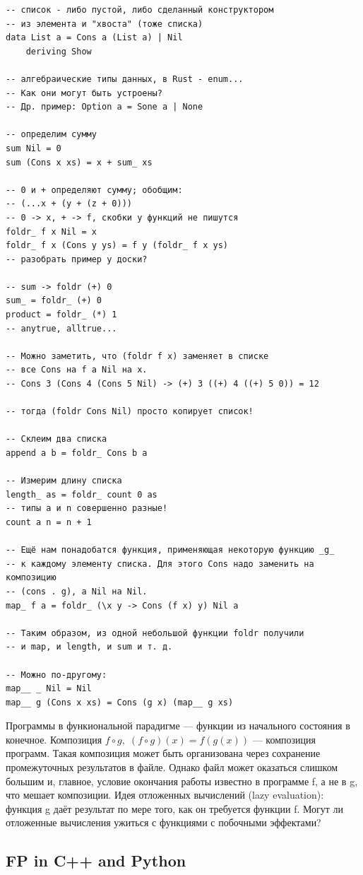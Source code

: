\documentclass{book}
\begin{document}
\begin{verbatim}
-- список - либо пустой, либо сделанный конструктором
-- из элемента и "хвоста" (тоже списка)
data List a = Cons a (List a) | Nil
    deriving Show

-- алгебраические типы данных, в Rust - enum...
-- Как они могут быть устроены?
-- Др. пример: Option a = Sone a | None

-- определим сумму
sum Nil = 0
sum (Cons x xs) = x + sum_ xs

-- 0 и + определяют сумму; обобщим:
-- (...x + (y + (z + 0)))
-- 0 -> x, + -> f, скобки у функций не пишутся
foldr_ f x Nil = x
foldr_ f x (Cons y ys) = f y (foldr_ f x ys)
-- разобрать пример у доски?

-- sum -> foldr (+) 0
sum_ = foldr_ (+) 0
product = foldr_ (*) 1
-- anytrue, alltrue...

-- Можно заметить, что (foldr f x) заменяет в списке
-- все Cons на f а Nil на x.
-- Cons 3 (Cons 4 (Cons 5 Nil) -> (+) 3 ((+) 4 ((+) 5 0)) = 12

-- тогда (foldr Cons Nil) просто копирует список!

-- Склеим два списка
append a b = foldr_ Cons b a

-- Измерим длину списка
length_ as = foldr_ count 0 as
-- типы a и n совершенно разные!
count a n = n + 1

-- Ещё нам понадобатся функция, применяющая некоторую функцию _g_
-- к каждому элементу списка. Для этого Cons надо заменить на композицию
-- (cons . g), а Nil на Nil.
map_ f a = foldr_ (\x y -> Cons (f x) y) Nil a

-- Таким образом, из одной небольшой функции foldr получили
-- и map, и length, и sum и т. д.

-- Можно по-другому:
map__ _ Nil = Nil
map__ g (Cons x xs) = Cons (g x) (map__ g xs)
\end{verbatim}

Программы в функиональной парадигме --- функции из начального состояния в конечное. Композиция $f
\circ g, \; (f \circ g)(x) = f(g(x))$ --- композиция программ. Такая композиция может быть
организована через сохранение промежуточных результатов в файле. Однако файл может оказаться
слишком большим и, главное, условие окончания работы известно в программе f, а не в g, что мешает
композиции. Идея отложенных вычислений (lazy evaluation): функция g даёт результат по мере того,
как он требуется функции f. Могут ли отложенные вычисления ужиться с функциями с побочными
эффектами?

\subsection{FP in C++ and Python}
\end{document}
